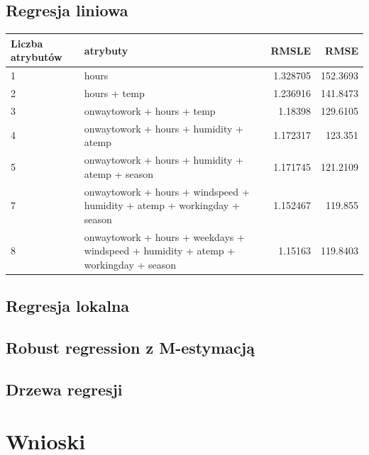 \documentclass[a4paper,12pt]{article}
\begin{document}
    \subsection{Regresja liniowa}
    \begin{tabular}{|l|p{6cm}|r|r|}
\hline 
Liczba atrybutów & atrybuty & RMSLE & RMSE \\ 
\hline 
1 &  
hours 
 &  
1.328705
 &  
152.3693
 \\ 
\hline 
2 &  
hours + temp
 &  
1.236916
 &  
141.8473
 \\ 
\hline 
3 &  
onwaytowork + hours + temp
 &  
1.18398
 &  
129.6105
 \\ 
\hline 
4 &  
onwaytowork + hours + humidity + atemp
 &  
1.172317
 &  
123.351
 \\ 
\hline 
5 &  onwaytowork + hours + humidity + atemp + season 
 &  
1.171745
 &  
121.2109
 \\ 
\hline 
7 & onwaytowork + hours + windspeed + humidity + atemp + workingday + season &  
1.152467
 &  
119.855
 \\ 
\hline 
8 &  
onwaytowork + hours + weekdays + windspeed + humidity + atemp + workingday + season  
 &  
1.15163
 &  
119.8403
 \\ 
\hline 
\end{tabular} 
	\subsection{Regresja lokalna}
    \subsection{Robust regression z M-estymacją}
    \subsection{Drzewa regresji}

\section{Wnioski}
\end{document}
